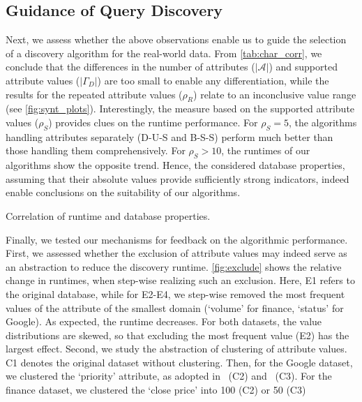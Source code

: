 \subsection{Guidance of Query Discovery}
\label{sec:exp_guidance}
Next, we assess whether the above observations enable us to guide the
selection of a discovery algorithm for the real-world data.
From \autoref{tab:char_corr}, we conclude that the
differences in the number of attributes ($|\mathcal{A}|$) and supported
attribute values ($|\Gamma_D|$) are too small to enable any differentiation,
while the results for the repeated attribute values ($\rho_R$) relate to
an inconclusive value range (see \autoref{fig:synt_plots}). Interestingly,
the measure based on the supported attribute values ($\rho_S$) provides
clues on the runtime performance. For $\rho_S=5$, the algorithms
handling attributes separately (D-U-S and B-S-S) perform much better than
those handling them comprehensively. For $\rho_S>10$, the runtimes of our
algorithms show the opposite trend. Hence, the considered database
properties, assuming that their absolute values provide sufficiently strong
indicators, indeed enable conclusions on the suitability of our algorithms.
\begin{table}[t]
	\footnotesize
	\caption{Correlation of runtime and database properties.}
	\label{tab:char_corr}
	\vspace{-1em}
	
	\vspace{-1em}
\end{table}
Finally, we tested our mechanisms for feedback on the algorithmic
performance.
First, we assessed whether the exclusion of attribute values may indeed serve
as an abstraction to reduce the discovery runtime.
\autoref{fig:exclude} shows the relative change in
runtimes, when step-wise realizing such an exclusion.
Here, E1 refers to the original database, while for E2-E4, we step-wise
removed the most frequent values of the attribute of the smallest
domain (`volume' for finance, `status' for Google). As expected, the
runtime  decreases. For both datasets, the value
distributions are skewed, so that excluding the most frequent
value (E2) has the largest effect.
Second, we study the abstraction of clustering of attribute values. C1
denotes the original
dataset without clustering. Then, for the Google dataset, we clustered the
`priority' attribute, as adopted in~\cite{reiss2011google} (C2)
and~\cite{reiss2012towards} (C3). For the finance dataset, we clustered the
`close price' into 100 (C2) or 50 (C3)
